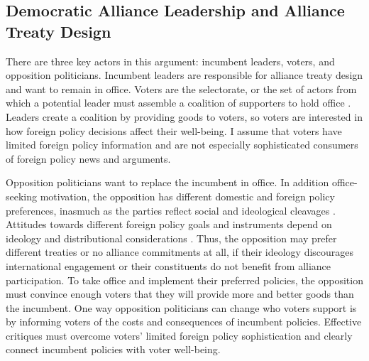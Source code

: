 \documentclass[12pt]{article}
\begin{document}
\subsection{Democratic Alliance Leadership and Alliance Treaty Design}


There are three key actors in this argument: incumbent leaders, voters, and opposition politicians.
Incumbent leaders are responsible for alliance treaty design and want to remain in office. 
Voters are the selectorate, or the set of actors from which a potential leader must assemble a coalition of supporters to hold office \citep{BDMetal2002}. 
Leaders create a coalition by providing goods to voters, so voters are interested in how foreign policy decisions affect their well-being.
I assume that voters have limited foreign policy information and are not especially sophisticated consumers of foreign policy news and arguments. 


Opposition politicians want to replace the incumbent in office. 
In addition office-seeking motivation, the opposition has different domestic and foreign policy preferences, inasmuch as the parties reflect social and ideological cleavages \citep{Leedsetal2009}. 
Attitudes towards different foreign policy goals and instruments depend on ideology and distributional considerations \citep{MilnerTingley2015, Fordham2019}. 
Thus, the opposition may prefer different treaties or no alliance commitments at all, if their ideology discourages international engagement or their constituents do not benefit from alliance participation. 
To take office and implement their preferred policies, the opposition must convince enough voters that they will provide more and better goods than the incumbent. 
One way opposition politicians can change who voters support is by informing voters of the costs and consequences of incumbent policies. 
Effective critiques must overcome voters' limited foreign policy sophistication and clearly connect incumbent policies with voter well-being. 
\end{document}
